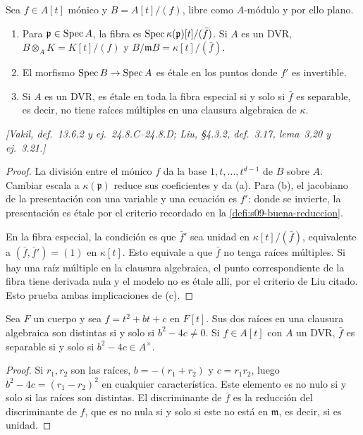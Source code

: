 \begin{prop}
\label{prop:s09-modelos-dimension-cero}
Sea $f\in A[t]$ mónico y $B=A[t]/(f)$, libre como $A$-módulo y por ello plano.
\begin{enumerate}[label=(\alph*)]
\item Para $\mathfrak p\in\operatorname{Spec} A$, la fibra es $\operatorname{Spec}\kappa(\mathfrak p)[t]/(\bar f)$. Si $A$ es un DVR, $B\otimes_AK=K[t]/(f)$ y $B/\mathfrak mB=\kappa[t]/(\bar f)$.
\item El morfismo $\operatorname{Spec} B\to\operatorname{Spec} A$ es étale en los puntos donde $f'$ es invertible.
\item Si $A$ es un DVR, es étale en toda la fibra especial si y solo si $\bar f$ es separable, es decir, no tiene raíces múltiples en una clausura algebraica de $\kappa$.
\end{enumerate}
\emph{[Vakil, def.~13.6.2 y ej.~24.8.C--24.8.D; Liu, \S4.3.2, def.~3.17, lema~3.20 y ej.~3.21.]}
\end{prop}
\begin{proof}
La división entre el mónico $f$ da la base $1,t,\ldots,t^{d-1}$ de $B$ sobre $A$. Cambiar escala a $\kappa(\mathfrak p)$ reduce sus coeficientes y da (a). Para (b), el jacobiano de la presentación con una variable y una ecuación es $f'$: donde se invierte, la presentación es étale por el criterio recordado en la \cref{defi:s09-buena-reduccion}.

En la fibra especial, la condición es que $\bar f'$ sea unidad en $\kappa[t]/(\bar f)$, equivalente a $(\bar f,\bar f')=(1)$ en $\kappa[t]$. Esto equivale a que $\bar f$ no tenga raíces múltiples. Si hay una raíz múltiple en la clausura algebraica, el punto correspondiente de la fibra tiene derivada nula y el modelo no es étale allí, por el criterio de Liu citado. Esto prueba ambas implicaciones de (c).
\end{proof}

\begin{lema}
\label{lema:s09-discriminante-cuadratico}
Sea $F$ un cuerpo y sea $f=t^2+bt+c$ en $F[t]$. Sus dos raíces en una clausura algebraica son distintas si y solo si $b^2-4c\ne0$. Si $f\in A[t]$ con $A$ un DVR, $\bar f$ es separable si y solo si $b^2-4c\in A^\times$.
\end{lema}
\begin{proof}
Si $r_1,r_2$ son las raíces, $b=-(r_1+r_2)$ y $c=r_1r_2$, luego $b^2-4c=(r_1-r_2)^2$ en cualquier característica. Este elemento es no nulo si y solo si las raíces son distintas. El discriminante de $\bar f$ es la reducción del discriminante de $f$, que es no nula si y solo si este no está en $\mathfrak m$, es decir, si es unidad.
\end{proof}

